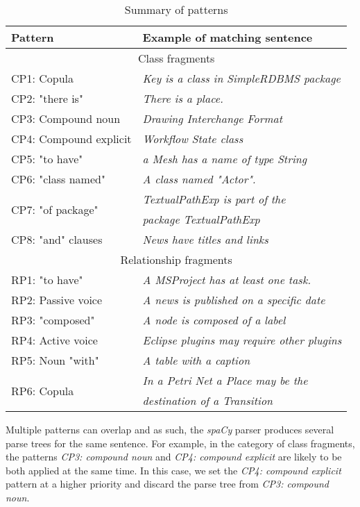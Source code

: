 \documentclass[sigconf]{acmart}
\begin{document}
\begin{table}
    \centering
    \begin{tabular}{|l|l|}
        \hline
        \textbf{Pattern}    &   \textbf{Example of matching sentence} \\ \hline
        \multicolumn{2}{|c|}{Class fragments}  \\ \hline
        CP1: Copula  &   \textit{Key is a class in SimpleRDBMS package} \\ \hline
        CP2: "there is"  &   \textit{There is a place.} \\ \hline
        CP3: Compound noun  &   \textit{Drawing Interchange Format} \\ \hline
        CP4: Compound explicit   &   \textit{Workflow State class} \\ \hline
        CP5: "to have"   &   \textit{a Mesh has a name of type String} \\ \hline
        CP6: "class named"   &   \textit{A class named "Actor".} \\ \hline
        \multirow{2}{*}{CP7: "of package"}
        &\textit{TextualPathExp is part of the}\\ 
        &\textit{package TextualPathExp} \\ \hline
        CP8: "and" clauses   &   \textit{News have titles and links}\\ \hline
        \multicolumn{2}{|c|}{Relationship fragments} \\ \hline
        RP1: "to have"   &   \textit{A MSProject has at least one task.} \\ \hline
        RP2: Passive voice   &   \textit{A news is published on a specific date} \\ \hline
        RP3: "composed"  &   \textit{A node is composed of a label} \\ \hline
        RP4: Active voice    &   \textit{Eclipse plugins may require other plugins} \\ \hline
        RP5: Noun "with" &   \textit{A table with a caption}\\ \hline
        \multirow{2}{*}{RP6: Copula}
        & \textit{In a Petri Net a Place may be the} \\
        & \textit{destination of a Transition} \\ \hline
    \end{tabular}
    \caption{Summary of patterns}
    \label{tab:grammars-summary}
\end{table}

Multiple patterns can overlap and as such, the \textit{spaCy} parser produces several parse trees for the same sentence. For example, in the category of class fragments, the patterns \textit{CP3: compound noun} and \textit{CP4: compound explicit} are likely to be both applied at the same time. In this case, we set the \textit{CP4: compound explicit} pattern at a higher priority and discard the parse tree from \textit{CP3: compound noun}. 
\end{document}
